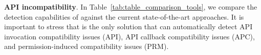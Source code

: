 \begin{comment}
These research efforts primarily focused on
behavioral differences when an app is installed on different
operating systems and/or hardware platforms.  They mainly
rely on hardware specifications and changes in the Android
documentation to uncover potential compatibility or
behavioral issues. Therefore, these approaches are not
useful when such platform related information is incomplete,
inconsistent, or unavailable.  Furthermore,  applying these
approaches to test an application on the entire vast
hardware ecosystem of Android devices may not be feasible
due to exponentially large system configurations.  Our work,
on the other hand, focuses on a more tractable and important
problem due to API evolution and how it can affect the apps
and their performance regardless of the operating system
distribution or the hardware the applications are running
on.

\end{comment}

\textbf{API incompatibility}. 
In Table~\ref{tab:table_comparison_tools}, we compare the
detection capabilities of \textsc{\@approach} against the
current state-of-the-art approaches. It is important to
stress that \@approach is the only solution that 
can automatically detect API invocation
compatibility issues (API), API callback compatibility
issues (APC), and permission-induced compatibility issues
(PRM). %

\begin{table}%
    
    \vspace{-0.5cm}
\end{table}

